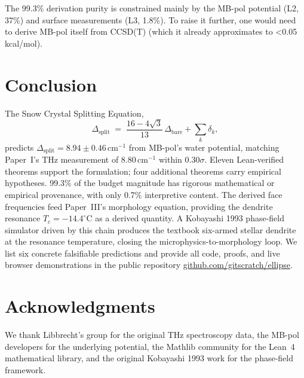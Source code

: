 \documentclass[11pt,a4paper]{article}
\begin{document}
The 99.3\% derivation purity is constrained mainly by the MB-pol potential (L2, 37\%) and surface measurements (L3, 1.8\%). To raise it further, one would need to derive MB-pol itself from CCSD(T) (which it already approximates to <0.05 kcal/mol).

\section{Conclusion}

The Snow Crystal Splitting Equation,
\[
\Delta_\text{split} \;=\; \frac{16 - 4\sqrt{3}}{13}\,\Delta_\text{bare} + \sum_k \delta_k,
\]
predicts $\Delta_\text{split} = 8.94 \pm 0.46\,\mathrm{cm}^{-1}$ from MB-pol's water potential, matching Paper~I's THz measurement of $8.80\,\mathrm{cm}^{-1}$ within $0.30\sigma$. Eleven Lean-verified theorems support the formulation; four additional theorems carry empirical hypotheses. 99.3\% of the budget magnitude has rigorous mathematical or empirical provenance, with only 0.7\% interpretive content. The derived face frequencies feed Paper~III's morphology equation, providing the dendrite resonance $T_c = -14.4^\circ$C as a derived quantity. A Kobayashi 1993 phase-field simulator driven by this chain produces the textbook six-armed stellar dendrite at the resonance temperature, closing the microphysics-to-morphology loop. We list six concrete falsifiable predictions and provide all code, proofs, and live browser demonstrations in the public repository \href{https://github.com/gitscratch/ellipse}{github.com/gitscratch/ellipse}.

\section*{Acknowledgments}

We thank Libbrecht's group for the original THz spectroscopy data, the MB-pol developers for the underlying potential, the Mathlib community for the Lean~4 mathematical library, and the original Kobayashi 1993 work for the phase-field framework.
\end{document}
